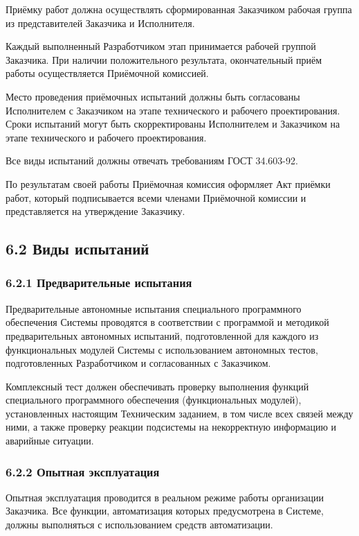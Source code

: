 Приёмку работ должна осуществлять сформированная Заказчиком рабочая
группа из представителей Заказчика и Исполнителя.

Каждый выполненный Разработчиком этап принимается рабочей группой
Заказчика. При наличии положительного результата, окончательный приём
работы осуществляется Приёмочной комиссией.

Место проведения приёмочных испытаний должны быть согласованы Исполнителем
с Заказчиком на этапе технического и рабочего проектирования. Сроки
испытаний могут быть скорректированы Исполнителем и Заказчиком на этапе
технического и рабочего проектирования.

Все виды испытаний должны отвечать требованиям ГОСТ 34.603-92.

По результатам своей работы Приёмочная комиссия оформляет Акт приёмки
работ, который подписывается всеми членами Приёмочной комиссии и
представляется на утверждение Заказчику.

\subsection*{6.2 Виды испытаний}
\subsubsection*{6.2.1 Предварительные испытания}
Предварительные автономные испытания специального программного обеспечения
Системы проводятся в соответствии с программой и методикой предварительных
автономных испытаний, подготовленной для каждого из функциональных модулей
Системы с использованием автономных тестов, подготовленных Разработчиком и
согласованных с Заказчиком.

Комплексный тест должен обеспечивать проверку выполнения функций
специального программного обеспечения (функциональных модулей),
установленных настоящим Техническим заданием, в том числе всех
связей между ними, а также проверку реакции подсистемы на некорректную
информацию и аварийные ситуации.

\subsubsection*{6.2.2 Опытная эксплуатация}
Опытная эксплуатация проводится в реальном режиме работы организации
Заказчика. Все функции, автоматизация которых предусмотрена в Системе,
должны выполняться с использованием средств автоматизации.

